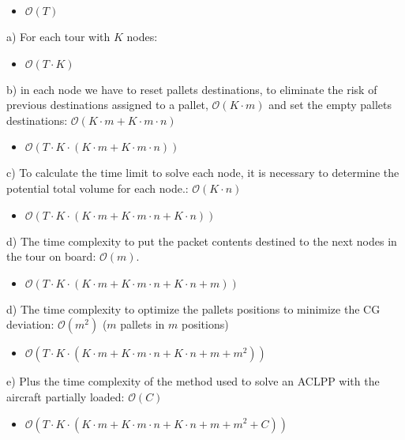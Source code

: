 \documentclass[preprint,authoryear]{elsarticle}
\begin{document}
{\begin{itemize}
	\item $\mathcal{O}(T)$
\end{itemize}


a) For each tour with $K$ nodes:
\begin{itemize}
	\item $\mathcal{O}(T \cdot K)$
\end{itemize}


b) in each node we have to reset pallets destinations, to eliminate the risk of previous destinations assigned to a pallet, $\mathcal{O}(K \cdot m)$ and set the empty pallets destinations: $\mathcal{O}(K \cdot m + K \cdot m \cdot n)$
\begin{itemize}
	\item $\mathcal{O}(T \cdot K \cdot (K \cdot m + K \cdot m \cdot n))$
\end{itemize}

c) To calculate the time limit to solve each node, it is necessary to determine the potential total volume for each node.: $\mathcal{O}(K \cdot n)$
\begin{itemize}
	\item $\mathcal{O}(T \cdot K \cdot (K \cdot m + K \cdot m \cdot n + K \cdot n))$
\end{itemize}

d) The time complexity to put the packet contents destined to the next nodes in the tour on board: $\mathcal{O}(m)$.
\begin{itemize}
	\item $\mathcal{O}(T \cdot K \cdot (K \cdot m + K \cdot m \cdot n + K \cdot n + m))$
\end{itemize}

d) The time complexity to optimize the pallets positions to minimize the CG deviation: $\mathcal{O}(m^2)$ ($m$ pallets in $m$ positions)
\begin{itemize}
	\item $\mathcal{O}(T \cdot K \cdot (K \cdot m + K \cdot m \cdot n + K \cdot n + m + m^2))$
\end{itemize}

e) Plus the time complexity of the method used to solve an ACLPP with the aircraft partially loaded: $\mathcal{O}(C)$
\begin{itemize}
	\item $\mathcal{O}(T \cdot K \cdot (K \cdot m + K \cdot m \cdot n + K \cdot n + m + m^2 + C))$
\end{itemize}

}
\end{document}
